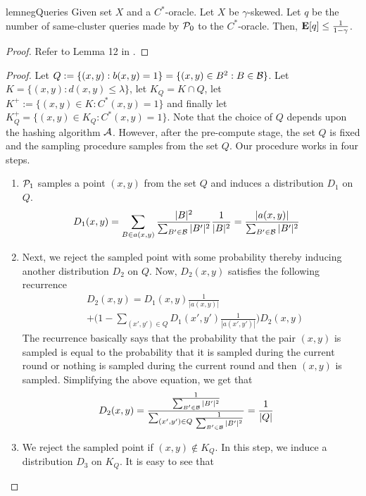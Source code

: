\begin{restatable}{lem}{negQueries}
\label{lemma:negQueries}Given set $X$ and a $C^*$-oracle. Let $X$ be $\gamma$-skewed. Let $q$ be the number of same-cluster queries made by $\mathcal P_0$ to the $C^*$-oracle. Then, $\mathbf E[q] \le \frac{1}{1-\gamma}$.
\end{restatable}
\begin{proof}
Refer to Lemma 12 in \cite{kushagra2018semisupervised}.
\end{proof}

\posDistribution*
\begin{proof}
Let $Q := \{(x, y): b(x, y) = 1\} = \{(x, y) \in B^2: B \in \mathcal B\}$. Let $K = \{(x, y): d(x, y) \le \lambda\}$, let $K_Q = K\cap Q$, let $K^+ := \{(x, y) \in K: C^*(x, y) = 1\}$ and finally let $K_Q^+ = \{(x, y) \in K_Q : C^*(x, y) = 1\}$. Note that the choice of $Q$ depends upon the hashing algorithm $\mathcal A$. However, after the pre-compute stage, the set $Q$ is fixed and the sampling procedure samples from the set $Q$. Our procedure works in four steps. 
\begin{enumerate}[noitemsep,label=\textbf{S.\arabic*}]
  \item $\mathcal P_1$ samples a point $(x, y)$ from the set $Q$ and induces a distribution $D_1$ on $Q$. 
  \begin{align*}
    &D_1(x, y) = \sum_{B \in a(x, y)} \frac{|B|^2}{\sum_{B' \in \mathcal B}|B'|^2}\frac{1}{|B|^2} = \frac{|a(x, y)|}{\sum_{B' \in \mathcal B}|B'|^2}
  \end{align*}
  \item Next, we reject the sampled point with some probability thereby inducing another distribution $D_2$ on $Q$. Now, $D_2(x, y)$ satisfies the following recurrence
  \begin{align*}
    &D_2(x, y) = D_1(x, y) \frac{1}{|a(x, y)|} \\
    &+ \Big(1-\sum_{(x', y') \in Q} D_1(x', y') \frac{1}{|a(x', y')|}\Big)D_2(x, y)
  \end{align*}
  The recurrence basically says that the probability that the pair $(x, y)$ is sampled is equal to the probability that it is sampled during the current round or nothing is sampled during the current round and then $(x, y)$ is sampled. Simplifying the above equation, we get that
   \begin{align*}
    &D_2(x, y) = \frac{\frac{1}{\sum_{B' \in \mathcal B}|B'|^2}}{\sum_{(x', y') \in Q}\frac{1}{\sum_{B' \in \mathcal B}|B'|^2}} = \frac{1}{|Q|}
  \end{align*}
  \item We reject the sampled point if $(x, y) \not\in K_Q$. In this step, we induce a distribution $D_3$ on $K_Q$. It is easy to see that

\end{enumerate}
\end{proof}

